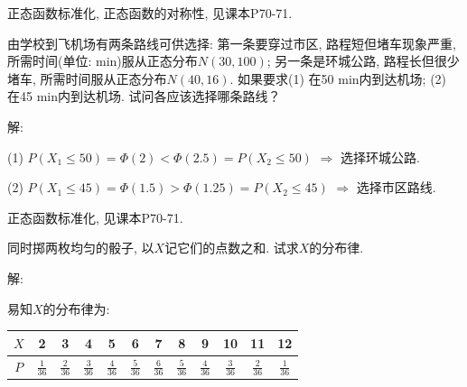 \documentclass[standard]{ExBook}
\renewenvironment{shaded}{%
  \def\FrameCommand{\fboxsep=\FrameSep \colorbox{shadecolor}}%
  \MakeFramed{\advance\hsize-\width \FrameRestore}%
}{%
  \endMakeFramed
}
\begin{document}
\begin{qitems}
\textcolor{themeColor}{\selectfont {} 正态函数标准化, 正态函数的对称性, 见课本P70-71.}

\vspace{2.5cm-5em}

    \begin{bbox}
    \begin{shaded}
        \qitem
由学校到飞机场有两条路线可供选择: 第一条要穿过市区, 路程短但堵车现象严重, 所需时间(单位: min)服从正态分布$N(30,100)$; 另一条是环城公路, 路程长但很少堵车, 所需时间服从正态分布$N(40,16)$. 如果要求(1) 在50 min内到达机场; (2) 在45 min内到达机场. 试问各应该选择哪条路线？
    \end{shaded}
    \end{bbox}

\vspace{\dimexpr2.5cm-5em\relax}

解: 

(1) $P(X_{1}\leq50)=\Phi(2)<\Phi(2.5)=P(X_{2}\leq50)$ $\Longrightarrow$ 选择环城公路.

(2) $P(X_{1}\leq45)=\Phi(1.5)>\Phi(1.25)=P(X_{2}\leq45)$ $\Longrightarrow$ 选择市区路线.

\textcolor{themeColor}{\selectfont {} 正态函数标准化, 见课本P70-71.}

\vspace{2.5cm-5em}

    \begin{bbox}
    \begin{shaded}
        \qitem
同时掷两枚均匀的骰子, 以$X$记它们的点数之和. 试求$X$的分布律.
    \end{shaded}
    \end{bbox}

\vspace{\dimexpr2.5cm-5em\relax}

解: 

易知$X$的分布律为:
\begin{center}
\setlength{\tabcolsep}{12pt}
\begin{tabular}{c|ccccccccccc}
    \hline
    $X$ & 2 & 3 & 4 & 5 & 6 & 7 & 8 & 9 & 10 & 11 & 12\\
    \hline
    $P$ & $\frac{1}{36}$ & $\frac{2}{36}$ & $\frac{3}{36}$ & $\frac{4}{36}$ & $\frac{5}{36}$ & $\frac{6}{36}$ & $\frac{5}{36}$ & $\frac{4}{36}$ & $\frac{3}{36}$ & $\frac{2}{36}$ & $\frac{1}{36}$ \\
    \hline
\end{tabular}
\end{center}


\end{qitems}
\end{document}
